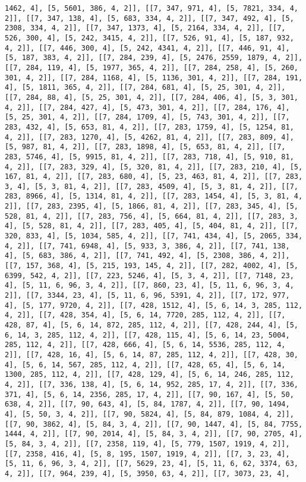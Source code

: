 \documentclass[12pt,fleqn]{article}\usepackage{../../common}
\begin{document}
\begin{verbatim}
1462, 4], [5, 5601, 386, 4, 2]], [[7, 347, 971, 4], [5, 7821, 334, 4, 2]], [[7, 347, 138, 4], [5, 683, 334, 4, 2]], [[7, 347, 492, 4], [5, 2308, 334, 4, 2]], [[7, 347, 1373, 4], [5, 2164, 334, 4, 2]], [[7, 526, 300, 4], [5, 242, 3415, 4, 2]], [[7, 526, 91, 4], [5, 187, 932, 4, 2]], [[7, 446, 300, 4], [5, 242, 4341, 4, 2]], [[7, 446, 91, 4], [5, 187, 383, 4, 2]], [[7, 284, 239, 4], [5, 2476, 2559, 1879, 4, 2]], [[7, 284, 119, 4], [5, 1977, 365, 4, 2]], [[7, 284, 258, 4], [5, 260, 301, 4, 2]], [[7, 284, 1168, 4], [5, 1136, 301, 4, 2]], [[7, 284, 191, 4], [5, 1811, 365, 4, 2]], [[7, 284, 681, 4], [5, 25, 301, 4, 2]], [[7, 284, 88, 4], [5, 25, 301, 4, 2]], [[7, 284, 406, 4], [5, 3, 301, 4, 2]], [[7, 284, 427, 4], [5, 473, 301, 4, 2]], [[7, 284, 176, 4], [5, 25, 301, 4, 2]], [[7, 284, 1709, 4], [5, 743, 301, 4, 2]], [[7, 283, 432, 4], [5, 653, 81, 4, 2]], [[7, 283, 1759, 4], [5, 1254, 81, 4, 2]], [[7, 283, 1270, 4], [5, 4262, 81, 4, 2]], [[7, 283, 809, 4], [5, 987, 81, 4, 2]], [[7, 283, 1898, 4], [5, 653, 81, 4, 2]], [[7, 283, 5746, 4], [5, 9915, 81, 4, 2]], [[7, 283, 718, 4], [5, 910, 81, 4, 2]], [[7, 283, 329, 4], [5, 320, 81, 4, 2]], [[7, 283, 210, 4], [5, 167, 81, 4, 2]], [[7, 283, 680, 4], [5, 23, 463, 81, 4, 2]], [[7, 283, 3, 4], [5, 3, 81, 4, 2]], [[7, 283, 4509, 4], [5, 3, 81, 4, 2]], [[7, 283, 8966, 4], [5, 1314, 81, 4, 2]], [[7, 283, 1454, 4], [5, 3, 81, 4, 2]], [[7, 283, 2395, 4], [5, 1866, 81, 4, 2]], [[7, 283, 345, 4], [5, 528, 81, 4, 2]], [[7, 283, 756, 4], [5, 664, 81, 4, 2]], [[7, 283, 3, 4], [5, 528, 81, 4, 2]], [[7, 283, 405, 4], [5, 404, 81, 4, 2]], [[7, 320, 833, 4], [5, 1034, 585, 4, 2]], [[7, 741, 434, 4], [5, 2065, 334, 4, 2]], [[7, 741, 6948, 4], [5, 933, 3, 386, 4, 2]], [[7, 741, 138, 4], [5, 683, 386, 4, 2]], [[7, 741, 492, 4], [5, 2308, 386, 4, 2]], [[7, 157, 368, 4], [5, 215, 193, 145, 4, 2]], [[7, 282, 4002, 4], [5, 6399, 542, 4, 2]], [[7, 223, 5246, 4], [5, 3, 4, 2]], [[7, 7148, 23, 4], [5, 11, 6, 96, 3, 4, 2]], [[7, 860, 23, 4], [5, 11, 6, 96, 3, 4, 2]], [[7, 3344, 23, 4], [5, 11, 6, 96, 5391, 4, 2]], [[7, 172, 977, 4], [5, 177, 9720, 4, 2]], [[7, 428, 1512, 4], [5, 6, 14, 3, 285, 112, 4, 2]], [[7, 428, 354, 4], [5, 6, 14, 7720, 285, 112, 4, 2]], [[7, 428, 87, 4], [5, 6, 14, 872, 285, 112, 4, 2]], [[7, 428, 244, 4], [5, 6, 14, 3, 285, 112, 4, 2]], [[7, 428, 115, 4], [5, 6, 14, 23, 5004, 285, 112, 4, 2]], [[7, 428, 666, 4], [5, 6, 14, 5536, 285, 112, 4, 2]], [[7, 428, 16, 4], [5, 6, 14, 87, 285, 112, 4, 2]], [[7, 428, 30, 4], [5, 6, 14, 567, 285, 112, 4, 2]], [[7, 428, 65, 4], [5, 6, 14, 1300, 285, 112, 4, 2]], [[7, 428, 129, 4], [5, 6, 14, 246, 285, 112, 4, 2]], [[7, 336, 138, 4], [5, 6, 14, 952, 285, 17, 4, 2]], [[7, 336, 371, 4], [5, 6, 14, 2356, 285, 17, 4, 2]], [[7, 90, 167, 4], [5, 50, 638, 4, 2]], [[7, 90, 643, 4], [5, 84, 1787, 4, 2]], [[7, 90, 1494, 4], [5, 50, 3, 4, 2]], [[7, 90, 5824, 4], [5, 84, 879, 1084, 4, 2]], [[7, 90, 3862, 4], [5, 84, 3, 4, 2]], [[7, 90, 1447, 4], [5, 84, 7755, 1444, 4, 2]], [[7, 90, 2014, 4], [5, 84, 3, 4, 2]], [[7, 90, 2705, 4], [5, 84, 3, 4, 2]], [[7, 2358, 119, 4], [5, 779, 1507, 1919, 4, 2]], [[7, 2358, 416, 4], [5, 8, 195, 1507, 1919, 4, 2]], [[7, 3, 23, 4], [5, 11, 6, 96, 3, 4, 2]], [[7, 5629, 23, 4], [5, 11, 6, 62, 3374, 63, 4, 2]], [[7, 964, 239, 4], [5, 3950, 63, 4, 2]], [[7, 3073, 23, 4], 
\end{verbatim}
\end{document}
